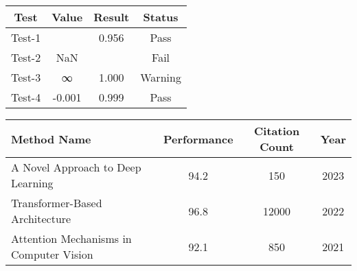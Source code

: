 \begin{tabular}{|c|c|c|c|}
\hline
Test & Value & Result & Status \\
\hline
Test-1 &  & 0.956 & Pass \\
Test-2 & NaN &  & Fail \\
Test-3 & ∞ & 1.000 & Warning \\
Test-4 & -0.001 & 0.999 & Pass \\
\hline
\end{tabular}

\begin{tabular}{|p{3cm}|c|c|c|}
\hline
Method Name & Performance & Citation Count & Year \\
\hline
A Novel Approach to Deep Learning & 94.2 & 150 & 2023 \\
Transformer-Based Architecture~\cite{transformer2017} & 96.8 & 12000 & 2022 \\
Attention Mechanisms in Computer Vision~\cite{attention2020} & 92.1 & 850 & 2021 \\
\hline
\end{tabular}